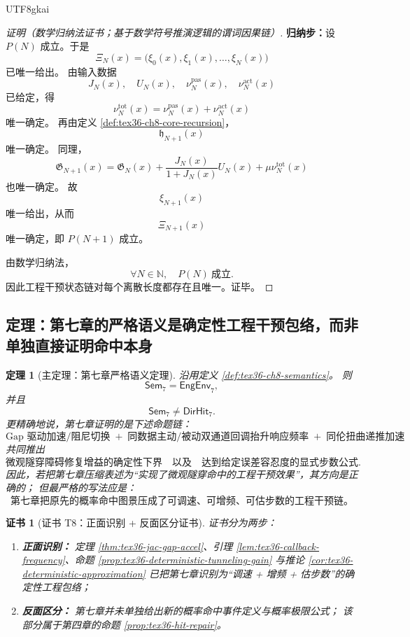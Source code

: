 \documentclass[12pt]{article}
\newtheorem{theorem}{定理}[section]
\newtheorem{Certificate}{证书}[section]
\newcommand{\NN}{\mathbb{N}}
\begin{document}
\begin{CJK*}{UTF8}{gkai}
\begin{proof}[证明（数学归纳法证书；基于数学符号推演逻辑的谓词因果链）]
\textbf{归纳步：}设 $P(N)$ 成立。于是
\[
  \Xi_N(x)
  =
  \bigl(\xi_0(x),\xi_1(x),\ldots,\xi_N(x)\bigr)
\]
已唯一给出。
由输入数据
\[
  J_N(x),\quad U_N(x),\quad
  \nu_N^{\mathrm{pas}}(x),\quad \nu_N^{\mathrm{act}}(x)
\]
已给定，得
\[
  \nu_N^{\mathrm{tot}}(x)
  =
  \nu_N^{\mathrm{pas}}(x)+\nu_N^{\mathrm{act}}(x)
\]
唯一确定。
再由定义 \ref{def:tex36-ch8-core-recursion}，
\[
  \mathfrak h_{N+1}(x)
\]
唯一确定。
同理，
\[
  \mathfrak G_{N+1}(x)
  =
  \mathfrak G_N(x)
  +
  \frac{J_N(x)}{1+J_N(x)}U_N(x)
  +
  \mu \nu_N^{\mathrm{tot}}(x)
\]
也唯一确定。
故
\[
  \xi_{N+1}(x)
\]
唯一给出，从而
\[
  \Xi_{N+1}(x)
\]
唯一确定，即 $P(N+1)$ 成立。

由数学归纳法，
\[
  \forall N\in\NN,\quad P(N)\ \text{成立}.
\]
因此工程干预状态链对每个离散长度都存在且唯一。证毕。
\end{proof}

\subsection{定理：第七章的严格语义是确定性工程干预包络，而非单独直接证明命中本身}
\label{subsec:tex36-ch8-theorem}

\begin{theorem}[主定理：第七章严格语义定理]
\label{thm:tex36-ch8-semantic}
沿用定义 \ref{def:tex36-ch8-semantics}。
则
\[
  \mathsf{Sem}_7=\mathsf{EngEnv}_7,
\]
并且
\[
  \mathsf{Sem}_7\neq \mathsf{DirHit}_7.
\]
更精确地说，第七章证明的是下述命题链：
\[
  \text{Gap 驱动加速/阻尼切换}
  \;+\;
  \text{同数据主动/被动双通道回调抬升响应频率}
  \;+\;
  \text{同伦扭曲递推加速}
\]
共同推出
\[
  \text{微观隧穿障碍修复增益的确定性下界}
  \quad\text{以及}\quad
  \text{达到给定误差容忍度的显式步数公式}.
\]
因此，若把第七章压缩表述为“实现了微观隧穿命中的工程干预效果”，其方向是正确的；
但最严格的写法应是：
\[
  \text{第七章把原先的概率命中图景压成了可调速、可增频、可估步数的工程干预链。}
\]
\end{theorem}

\begin{Certificate}[证书 T8：正面识别 + 反面区分证书]
\label{cert:tex36-t8}
证书分为两步：
\begin{enumerate}
  \item \textbf{正面识别：}
  定理 \ref{thm:tex36-jac-gap-accel}、引理 \ref{lem:tex36-callback-frequency}、命题 \ref{prop:tex36-deterministic-tunneling-gain}
    与推论 \ref{cor:tex36-deterministic-approximation}
  已把第七章识别为“调速 + 增频 + 估步数”的确定性工程包络；
  \item \textbf{反面区分：}
  第七章并未单独给出新的概率命中事件定义与概率极限公式；
  该部分属于第四章的命题 \ref{prop:tex36-hit-repair}。
\end{enumerate}
\end{Certificate}


\end{CJK*}
\end{document}

